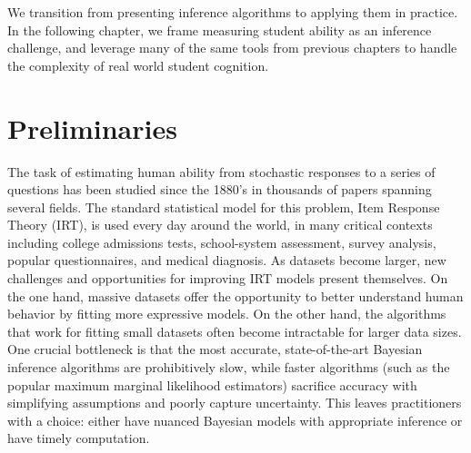 We transition from presenting inference algorithms to applying them in practice. In the following chapter, we frame measuring student ability as an inference challenge, and leverage many of the same tools from previous chapters to handle the complexity of real world student cognition.

\section{Preliminaries}
\label{sec:introduction}

The task of estimating human ability from stochastic responses to a series of questions has been studied since the 1880's \cite{edgeworth1888statistics}
in thousands of papers spanning several fields.
The standard statistical model for this problem, Item Response Theory (IRT), is used every day around the world, in many critical contexts including college admissions tests, school-system assessment, survey analysis, popular questionnaires, and medical diagnosis.
As datasets become larger, new challenges and opportunities for improving IRT models present themselves.
On the one hand, massive datasets offer the opportunity to better understand human behavior by fitting more expressive models.
On the other hand, the algorithms that work for fitting small datasets often become intractable for larger data sizes.
One crucial bottleneck is that the most accurate, state-of-the-art Bayesian inference algorithms are prohibitively slow, while faster algorithms (such as the popular maximum marginal likelihood estimators) sacrifice accuracy with simplifying assumptions and poorly capture uncertainty.
This leaves practitioners with a choice: either have nuanced Bayesian models with appropriate inference or have timely computation.

